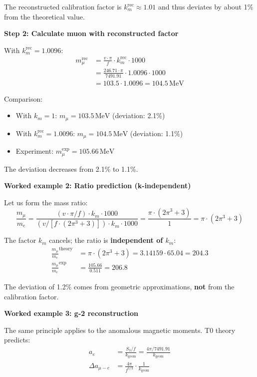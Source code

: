 	The reconstructed calibration factor is \(k_m^{\text{rec}} \approx 1.01\) and thus deviates by about 1\% from the theoretical value.
	
	\textbf{Step 2: Calculate muon with reconstructed factor}
	
	With \(k_m^{\text{rec}} = 1.0096\):
	\begin{align}
		m_\mu^{\text{rec}} &= \frac{v \cdot \pi}{f} \cdot k_m^{\text{rec}} \cdot 1000 \\
		&= \frac{246.71 \cdot \pi}{7491.91} \cdot 1.0096 \cdot 1000 \\
		&= 103.5 \cdot 1.0096 = 104.5\,\text{MeV}
	\end{align}
	
	Comparison:
	\begin{itemize}
		\item With \(k_m = 1\): \(m_\mu = 103.5\,\text{MeV}\) (deviation: 2.1\%)
		\item With \(k_m^{\text{rec}} = 1.0096\): \(m_\mu = 104.5\,\text{MeV}\) (deviation: 1.1\%)
		\item Experiment: \(m_\mu^{\exp} = 105.66\,\text{MeV}\)
	\end{itemize}
	
	The deviation decreases from 2.1\% to 1.1\%.
	
	\textbf{Worked example 2: Ratio prediction (k-independent)}
	
	Let us form the mass ratio:
	\begin{equation}
		\frac{m_\mu}{m_e} = \frac{(v \cdot \pi / f) \cdot k_m \cdot 1000}{(v / [f \cdot (2\pi^3 + 3)]) \cdot k_m \cdot 1000} = \frac{\pi \cdot (2\pi^3 + 3)}{1} = \pi \cdot (2\pi^3 + 3)
	\end{equation}
	
	The factor \(k_m\) cancels; the ratio is \textbf{independent of \(k_m\)}:
	\begin{align}
		\frac{m_\mu}{m_e}^{\text{theory}} &= \pi \cdot (2\pi^3 + 3) = 3.14159 \cdot 65.04 = 204.3 \\
		\frac{m_\mu}{m_e}^{\exp} &= \frac{105.66}{0.511} = 206.8
	\end{align}
	
	The deviation of 1.2\% comes from geometric approximations, \textbf{not} from the calibration factor.
	
	\textbf{Worked example 3: g-2 reconstruction}
	
	The same principle applies to the anomalous magnetic moments. T0 theory predicts:
	\begin{align}
		a_e &= \frac{S_3/f}{k_{\text{geom}}} = \frac{4\pi/7491.91}{k_{\text{geom}}} \\
		\Delta a_{\mu-e} &= \frac{4\pi}{f^{5/3}} \cdot \frac{1}{k_{\text{geom}}}
	\end{align}
	
